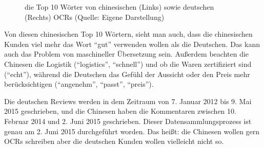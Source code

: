 \begin{figure}[htb]
    \caption[die Top 10 Wörter von chinesischen (Links) sowie deutschen (Rechts) OCRs]{die Top 10 Wörter von chinesischen (Links) sowie deutschen (Rechts) \ac{OCRs} (Quelle: Eigene Darstellung)}
    \label{fig:top10}
\end{figure}

Von diesen chinesischen Top 10 Wörtern, sieht man auch, dass die chinesischen Kunden viel mehr das Wort ``gut'' verwenden wollen als die Deutschen. Das kann auch das Problem von maschineller Übersetzung sein. Außerdem beachten die Chinesen die Logistik (``logistics'', ``schnell'') und ob die Waren zertifiziert sind (``echt''), während die Deutschen das Gefühl der Aussicht oder den Preis mehr berücksichtigen (``angenehm'', ``passt'', ``preis'').

Die deutschen Reviews werden in dem Zeitraum von 7. Januar 2012 bis 9. Mai 2015 geschrieben, und die Chinesen haben die Kommentaren zwischen 10. Februar 2014 und 2. Juni 2015 geschrieben. Dieser Datensammlungsprozess ist genau am 2. Juni 2015 durchgeführt worden. Das heißt: die Chinesen wollen gern \ac{OCRs} schreiben aber die deutschen Kunden wollen vielleicht nicht so.

